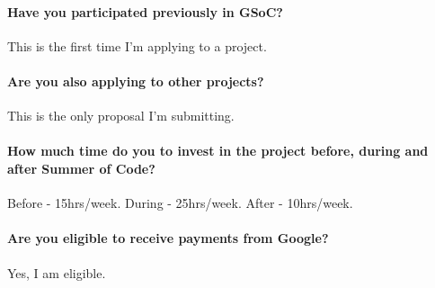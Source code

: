       
\paragraph*{Have you participated previously in GSoC? \\} \vspace*{-0.2cm}
    \vspace*{0.1cm}
    This is the first time I'm applying to a project.
\paragraph*{Are you also applying to other projects? \\} \vspace*{-0.2cm}
    \vspace*{0.1cm}
    This is the only proposal I'm submitting.
\paragraph*{How much time do you to invest in the project before, during and after Summer of Code? \\} \vspace*{-0.2cm}
    \vspace*{0.1cm}
    Before - 15hrs/week.
    During - 25hrs/week.
    After - 10hrs/week.
\paragraph*{Are you eligible to receive payments from Google? \\} \vspace*{-0.2cm}
    \vspace*{0.1cm}
    Yes, I am eligible.
